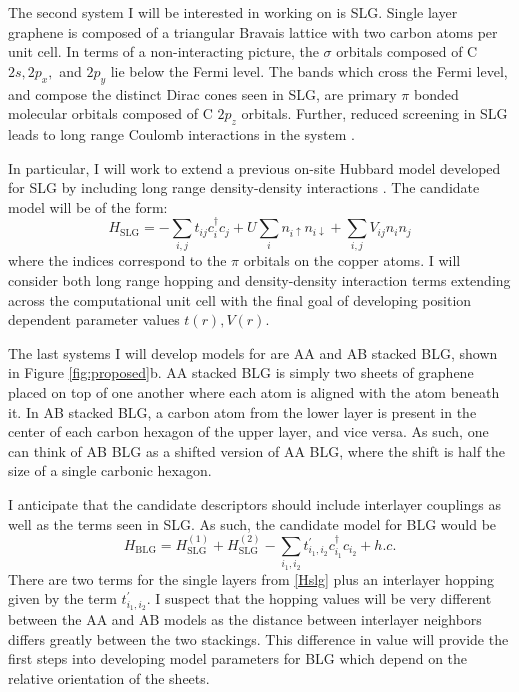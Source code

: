 \documentclass[12pt]{article}
\begin{document}
The second system I will be interested in working on is SLG.
Single layer graphene is composed of a triangular Bravais lattice with two carbon atoms per unit cell.
In terms of a non-interacting picture, the $\sigma$ orbitals composed of C $2s, 2p_x,$ and $2p_y$ lie below the Fermi level.
The bands which cross the Fermi level, and compose the distinct Dirac cones seen in SLG, are primary $\pi$ bonded molecular orbitals composed of C $2p_z$ orbitals.
Further, reduced screening in SLG leads to long range Coulomb interactions in the system \cite{Elias2012, Yu2013}.

In particular, I will work to extend a previous on-site Hubbard model developed for SLG \cite{Zheng2017, Wagner2015} by including long range density-density interactions .
The candidate model will be of the form:
\begin{equation}
H_\text{SLG} = -\sum_{i,j} t_{ij}c_i^\dagger c_j + U \sum_i n_{i\uparrow}n_{i\downarrow}  + \sum_{i,j} V_{ij} n_i n_j
\label{Hslg}
\end{equation}
where the indices correspond to the $\pi$ orbitals on the copper atoms.
I will consider both long range hopping and density-density interaction terms extending across the computational unit cell with the final goal of developing position dependent parameter values $t(r), V(r)$.

The last systems I will develop models for are AA and AB stacked BLG, shown in Figure \ref{fig:proposed}b.
AA stacked BLG is simply two sheets of graphene placed on top of one another where each atom is aligned with the atom beneath it.
In AB stacked BLG, a carbon atom from the lower layer is present in the center of each carbon hexagon of the upper layer, and vice versa.
As such, one can think of AB BLG as a shifted version of AA BLG, where the shift is half the size of a single carbonic hexagon.

I anticipate that the candidate descriptors should include interlayer couplings as well as the terms seen in SLG.
As such, the candidate model for BLG would be
\begin{equation}
H_\text{BLG} = H_\text{SLG}^{(1)} + H_\text{SLG}^{(2)} - \sum_{i_1, i_2} t_{i_1, i_2}^\prime c_{i_1}^\dagger c_{i_2} + h.c.
\label{Hblg}
\end{equation}
There are two terms for the single layers from \eqref{Hslg} plus an interlayer hopping given by the term $t_{i_1, i_2}^\prime.$
I suspect that the hopping values will be very different between the AA and AB models as the distance between interlayer neighbors differs greatly between the two stackings.
This difference in value will provide the first steps into developing model parameters for BLG which depend on the relative orientation of the sheets.
\end{document}
